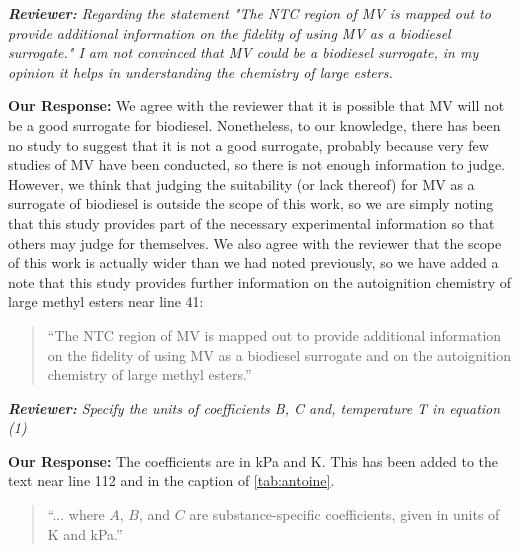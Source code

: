 \documentclass{article}
\newenvironment{reviewer}{\vspace{0.5\baselineskip}\begingroup\itshape\textbf{Reviewer:}}{\endgroup\vspace{0.5\baselineskip}}
\newenvironment{response}{\vspace{0.5\baselineskip}\textbf{Our Response:}}{\vspace{0.5\baselineskip}}
\begin{document}
\begin{reviewer}
    Regarding the statement "The NTC region of MV is mapped out to provide additional information on
    the fidelity of using MV as a biodiesel surrogate." I am not convinced that MV could be a
    biodiesel surrogate, in my opinion it helps in understanding the chemistry of large esters.
\end{reviewer}

\begin{response}
    We agree with the reviewer that it is possible that MV will not be a good surrogate for
    biodiesel. Nonetheless, to our knowledge, there has been no study to suggest that it is not a
    good surrogate, probably because very few studies of MV have been conducted, so there is not
    enough information to judge. However, we think that judging the suitability (or lack thereof)
    for MV as a surrogate of biodiesel is outside the scope of this work, so we are simply noting
    that this study provides part of the necessary experimental information so that others may judge
    for themselves. We also agree with the reviewer that the scope of this work is actually wider
    than we had noted previously, so we have added a note that this study provides further
    information on the autoignition chemistry of large methyl esters near line 41:

    \begin{quote}
        ``The NTC region of MV is mapped out to provide additional information on the fidelity of
        using MV as a biodiesel surrogate and on the autoignition chemistry of large methyl
        esters.''
    \end{quote}
\end{response}

\begin{reviewer}
    Specify the units of coefficients B, C  and, temperature T in equation (1)
\end{reviewer}

\begin{response}
    The coefficients are in \si{kPa} and \si{\kelvin}. This has been added to the text near line
    112 and in the caption of \cref{tab:antoine}.
    \begin{quote}
        ``... where \(A\), \(B\), and \(C\) are substance-specific coefficients, given in units of
        \si{\kelvin} and \si{\kPa}.''
    \end{quote}
\end{response}
\end{document}
